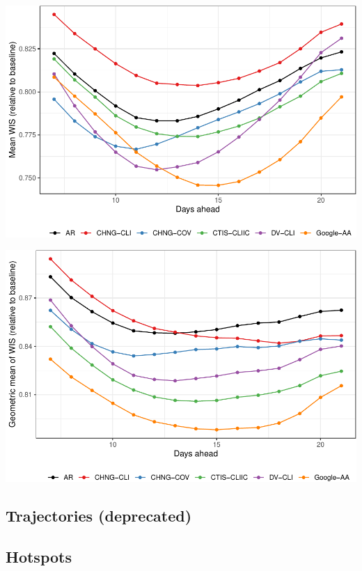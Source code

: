 \documentclass[9pt,twoside,lineno]{pnas-new}
\begin{document}
\begin{center}\includegraphics[width=\linewidth]{fig/fcast-gs-locations-1} \end{center}

\begin{center}\includegraphics[width=\linewidth]{fig/fcast-gs-locations-adjusted-1} \end{center}

\hypertarget{trajectories-deprecated}{%
\subsection{Trajectories (deprecated)}\label{trajectories-deprecated}}

\hypertarget{hotspots}{%
\subsection{Hotspots}\label{hotspots}}
\end{document}
